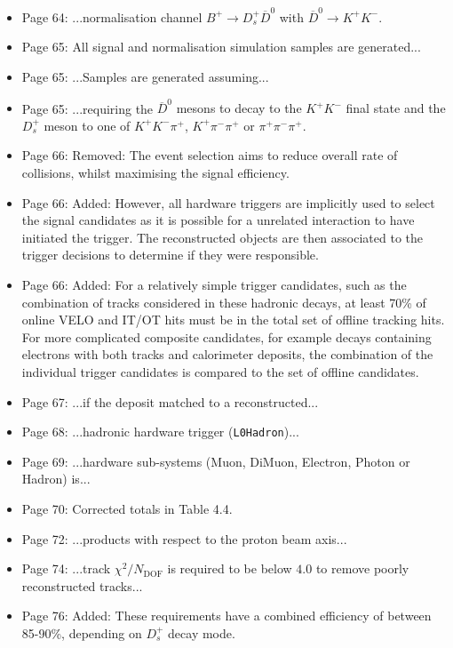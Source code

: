 \documentclass[12pt]{article}
\begin{document}
\begin{itemize}
\item Page 64: ...normalisation channel $B^+ \rightarrow D_s^+ \overline{D}^0$ {\color{red}with $\overline{D}^0 \rightarrow K^+K^-$.}
\item Page 65: {\color{red}All signal and normalisation simulation samples} are generated...
\item Page 65: ...Samples are {\color{red}generated} assuming...
\item Page 65: ...requiring the {\color{red}$\overline{D}^0$ mesons to decay to the $K^+K^-$ final state and the $D_s^+$ meson to one of $K^+K^-\pi^+$, $K^+\pi^-\pi^+$ or $\pi^+\pi^-\pi^+$.}
\item Page 66: Removed: {\color{red}The event selection aims to reduce overall rate of collisions, whilst maximising the signal efficiency.} 
\item Page 66: Added: {\color{red} However, all hardware triggers are implicitly used to select the signal candidates as it is possible for a unrelated interaction to have initiated the trigger. The reconstructed objects are then associated to the trigger decisions to determine if they were responsible.}
\item Page 66: Added: {\color{red}For a relatively simple trigger candidates, such as the combination of tracks considered in these hadronic decays, at least 70\% of online VELO and IT/OT hits must be in the total set of offline tracking hits. For more complicated composite candidates, for example decays containing electrons with both tracks and calorimeter deposits, the combination of the individual trigger candidates is compared to the set of offline candidates.} 
\item Page 67: ...if the {\color{red}deposit} matched to a reconstructed...
\item Page 68: ...hadronic {\color{red}hardware} trigger (\texttt{L0Hadron})...
\item Page 69: ...hardware sub-systems {\color{red}(Muon, DiMuon, Electron, Photon or Hadron)} is...
\item Page 70: Corrected totals in Table 4.4.
\item Page 72: ...products {\color{red}with respect to the proton beam axis}... 
\item Page 74: ...track $\chi^{2}/N_{\text{DOF}}$ is required to be below $4.0$ {\color{red}to remove poorly reconstructed tracks}...
\item Page 76: Added: {\color{red}These requirements have a combined efficiency of between 85-90\%, depending on $D_s^+$ decay mode.}

\end{itemize}
\end{document}
